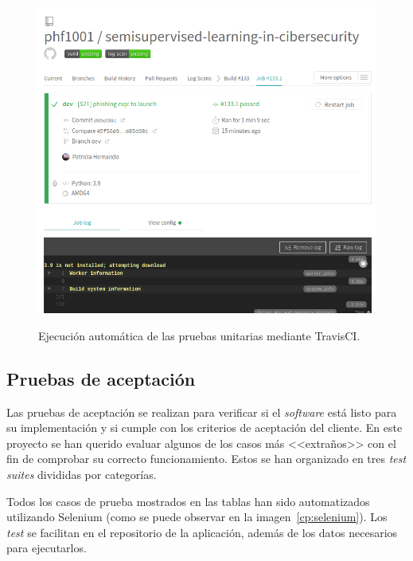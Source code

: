 \begin{figure}[h]
	\caption[TravisCI: ejecución automática de pruebas unitarias]{Ejecución automática de las pruebas unitarias mediante TravisCI.}
	\centering
	\includegraphics[width=\textwidth]{../img/anexos/cp/travis-tests}
	\label{d:cp-travis}
\end{figure}


\subsection{Pruebas de aceptación}
\label{s:pruebas-aceptación}

Las pruebas de aceptación se realizan para verificar si el \textit{software} está listo para su implementación y si cumple con los criterios de aceptación del cliente. En este proyecto se han querido evaluar algunos de los casos más <<extraños>> con el fin de comprobar su correcto funcionamiento. Estos se han organizado en tres \textit{test suites} divididas por categorías.

Todos los casos de prueba mostrados en las tablas han sido automatizados utilizando Selenium (como se puede observar en la imagen~\ref{cp:selenium}). Los \textit{test} se facilitan en el repositorio de la aplicación, además de los datos necesarios para ejecutarlos.

